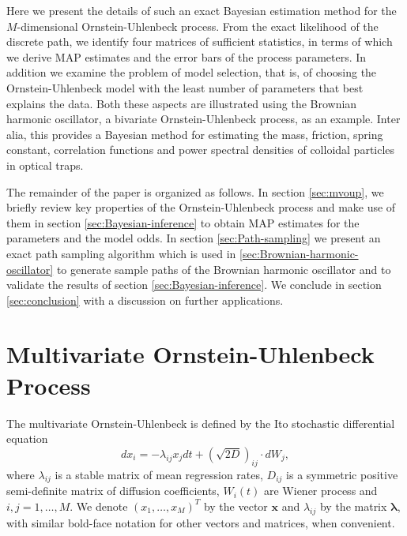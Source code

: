 \documentclass[english,aps, twocolumn, pre,superscriptaddress, notitlepage]{revtex4-1}
\begin{document}
Here we present the details of such an exact Bayesian estimation method
for the $M$-dimensional Ornstein-Uhlenbeck process. From the exact
likelihood of the discrete path, we identify four matrices of sufficient
statistics, in terms of which we derive MAP estimates and the error
bars of the process parameters. In addition we examine the problem
of model selection, that is, of choosing the Ornstein-Uhlenbeck model
with the least number of parameters that best explains the data. Both
these aspects are illustrated using the Brownian harmonic oscillator,
a bivariate Ornstein-Uhlenbeck process, as an example. Inter alia,
this provides a Bayesian method for estimating the mass, friction,
spring constant, correlation functions and power spectral densities
of colloidal particles in optical traps. 

The remainder of the paper is organized as follows. In section \ref{sec:mvoup},
we briefly review key properties of the Ornstein-Uhlenbeck process
and make use of them in section \ref{sec:Bayesian-inference} to obtain
MAP estimates for the parameters and the model odds. In section \ref{sec:Path-sampling}
we present an exact path sampling algorithm which is used in \ref{sec:Brownian-harmonic-oscillator}
to generate sample paths of the Brownian harmonic oscillator and to
validate the results of section \ref{sec:Bayesian-inference}. We
conclude in section \ref{sec:conclusion} with a discussion on further
applications. 

\section{Multivariate Ornstein-Uhlenbeck Process\label{sec:mvoup}}

The multivariate Ornstein-Uhlenbeck is defined by the Ito stochastic
differential equation \cite{gardiner1985handbook}
\begin{equation}
dx_{i}=-\lambda_{ij}x_{j}dt+(\sqrt{2D})_{ij}\cdot dW_{j},\label{eq:mvou}
\end{equation}
where $\lambda_{ij}$ is a stable matrix of mean regression rates,
$D_{ij}$ is a symmetric positive semi-definite matrix of diffusion
coefficients, $W_{i}(t)$ are Wiener process and $i,j=1,\ldots,M$.
We denote $(x_{1},\ldots,x_{M})^{T}$ by the vector $\boldsymbol{x}$
and $\lambda_{ij}$ by the matrix $\boldsymbol{\lambda}$, with similar
bold-face notation for other vectors and matrices, when convenient. 
\end{document}
